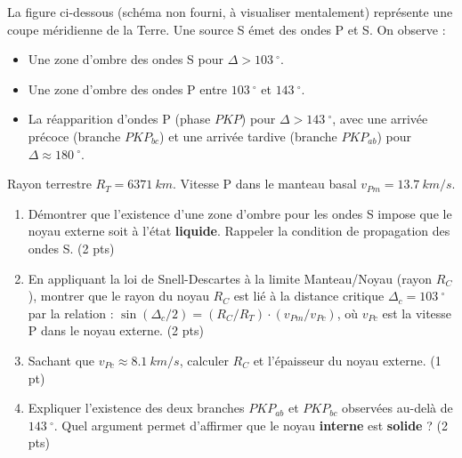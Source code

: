 \documentclass[11pt]{article}
\providecommand{\degree}{^{\circ}}
\begin{document}
\begin{exercice}
La figure ci-dessous (schéma non fourni, à visualiser mentalement) représente une coupe méridienne de la Terre. Une source S émet des ondes P et S. On observe :
\begin{itemize}
    \item Une zone d'ombre des ondes S pour $\Delta > \SI{103}{\degree}$.
    \item Une zone d'ombre des ondes P entre $\SI{103}{\degree}$ et $\SI{143}{\degree}$.
    \item La réapparition d'ondes P (phase $PKP$) pour $\Delta > \SI{143}{\degree}$, avec une arrivée précoce (branche $PKP_{bc}$) et une arrivée tardive (branche $PKP_{ab}$) pour $\Delta \approx \SI{180}{\degree}$.
\end{itemize}
Rayon terrestre $R_T = \SI{6371}{km}$. Vitesse P dans le manteau basal $v_{Pm} = \SI{13,7}{km/s}$.

\begin{enumerate}
    \item Démontrer que l'existence d'une zone d'ombre pour les ondes S impose que le noyau externe soit à l'état \textbf{liquide}. Rappeler la condition de propagation des ondes S. (2 pts)
    \item En appliquant la loi de Snell-Descartes à la limite Manteau/Noyau (rayon $R_C$), montrer que le rayon du noyau $R_C$ est lié à la distance critique $\Delta_c = \SI{103}{\degree}$ par la relation : $\sin(\Delta_c/2) = (R_C/R_T) \cdot (v_{Pm}/v_{Pc})$, où $v_{Pc}$ est la vitesse P dans le noyau externe. (2 pts)
    \item Sachant que $v_{Pc} \approx \SI{8,1}{km/s}$, calculer $R_C$ et l'épaisseur du noyau externe. (1 pt)
    \item Expliquer l'existence des deux branches $PKP_{ab}$ et $PKP_{bc}$ observées au-delà de $\SI{143}{\degree}$. Quel argument permet d'affirmer que le noyau \textbf{interne} est \textbf{solide} ? (2 pts)
\end{enumerate}
\end{exercice}
\end{document}
